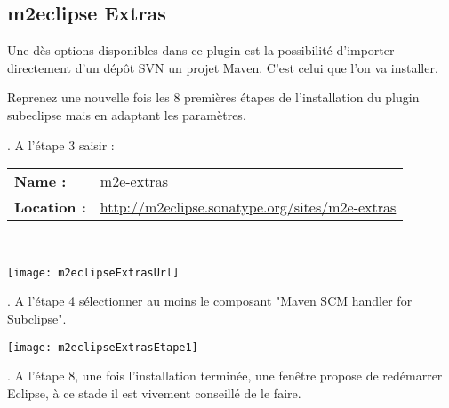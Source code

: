 
\subsection{m2eclipse Extras}
Une dès options disponibles dans ce plugin est la possibilité d'importer directement d'un dépôt SVN un projet Maven. C'est celui que l'on va installer.

\medskip

\noindent
Reprenez une nouvelle fois les 8 premières étapes de l'installation du plugin subeclipse mais en adaptant les paramètres.

\newpage

. A l'étape 3 saisir :\\

\begin{tabular}[!t]{ll}
{\bf Name : }&{m2e-extras}\\
{\bf Location : }&{\href{http://m2eclipse.sonatype.org/sites/m2e-extras}{http://m2eclipse.sonatype.org/sites/m2e-extras}}\\
\end{tabular}\\

\smallskip
\begin{center}
\texttt{[image: m2eclipseExtrasUrl]}
\end{center}

. A l'étape 4 sélectionner au moins le composant "Maven SCM handler for Subclipse".\\
\begin{center}
\texttt{[image: m2eclipseExtrasEtape1]}
\end{center}

. A l'étape 8, une fois l'installation terminée, une fenêtre propose de redémarrer Eclipse, à ce stade il est vivement conseillé de le faire.





